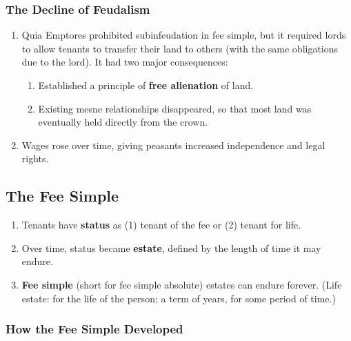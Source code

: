 \subsubsection{The Decline of Feudalism}

\begin{enumerate}
    \item Quia Emptores prohibited subinfeudation in fee simple, but it 
    required lords to allow tenants to transfer their land to others (with the 
    same obligations due to the lord). It had two major consequences:
    \begin{enumerate}
        \item Established a principle of \textbf{free alienation} of land.
        \item Existing mesne relationships disappeared, so that most land was 
        eventually held directly from the crown.
    \end{enumerate}
    \item Wages rose over time, giving peasants increased independence and 
    legal rights.
\end{enumerate}

\subsection{The Fee Simple}

\begin{enumerate}
    \item Tenants have \textbf{status} as (1) tenant of the fee or (2) tenant 
    for life.
    \item Over time, status became \textbf{estate}, defined by the length of 
    time it may endure.
    \item \textbf{Fee simple} (short for fee simple absolute) estates can 
    endure forever. (Life estate: for the life of the person; a term of years, 
    for some period of time.)
\end{enumerate}

\subsubsection{How the Fee Simple Developed}

